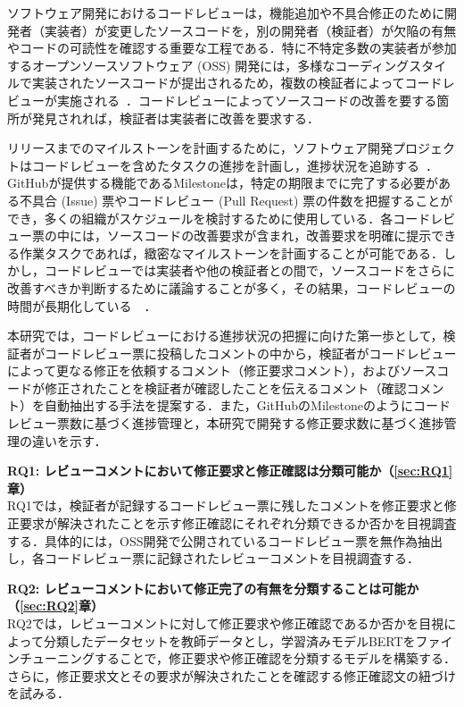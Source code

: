 \documentclass[submit,techrep,noauthor]{ipsj}
\newcommand{\RQOne}{レビューコメントにおいて修正要求と修正確認は分類可能か}
\newcommand{\RQTwo}{レビューコメントにおいて修正完了の有無を分類することは可能か}
\begin{document}
ソフトウェア開発におけるコードレビューは，機能追加や不具合修正のために開発者（実装者）が変更したソースコードを，別の開発者（検証者）が欠陥の有無やコードの可読性を確認する重要な工程である\cite{quality1}\cite{quality2}．特に不特定多数の実装者が参加するオープンソースソフトウェア (OSS) 開発には，多様なコーディングスタイルで実装されたソースコードが提出されるため，複数の検証者によってコードレビューが実施される~\cite{review_process}．コードレビューによってソースコードの改善を要する箇所が発見されれば，検証者は実装者に改善を要求する．

リリースまでのマイルストーンを計画するために，ソフトウェア開発プロジェクトはコードレビューを含めたタスクの進捗を計画し，進捗状況を追跡する~\cite{review_time}．GitHubが提供する機能であるMilestoneは，特定の期限までに完了する必要がある不具合 (Issue) 票やコードレビュー (Pull Request) 票の件数を把握することができ，多くの組織がスケジュールを検討するために使用している．各コードレビュー票の中には，ソースコードの改善要求が含まれ，改善要求を明確に提示できる作業タスクであれば，緻密なマイルストーンを計画することが可能である．しかし，コードレビューでは実装者や他の検証者との間で，ソースコードをさらに改善すべきか判断するために議論することが多く，その結果，コードレビューの時間が長期化している~\cite{review_time1}~\cite{review_time2}．

本研究では，コードレビューにおける進捗状況の把握に向けた第一歩として，検証者がコードレビュー票に投稿したコメントの中から，検証者がコードレビューによって更なる修正を依頼するコメント（修正要求コメント），およびソースコードが修正されたことを検証者が確認したことを伝えるコメント（確認コメント）を自動抽出する手法を提案する．また，GitHubのMilestoneのようにコードレビュー票数に基づく進捗管理と，本研究で開発する修正要求数に基づく進捗管理の違いを示す．

\noindent\textbf{RQ1: \RQOne（\ref{sec:RQ1}章）}\\
RQ1では，検証者が記録するコードレビュー票に残したコメントを修正要求と修正要求が解決されたことを示す修正確認にそれぞれ分類できるか否かを目視調査する．具体的には，OSS開発で公開されているコードレビュー票を無作為抽出し，各コードレビュー票に記録されたレビューコメントを目視調査する．

\noindent\textbf{RQ2: \RQTwo（\ref{sec:RQ2}章）}\\
RQ2では，レビューコメントに対して修正要求や修正確認であるか否かを目視によって分類したデータセットを教師データとし，学習済みモデルBERTをファインチューニングすることで，修正要求や修正確認を分類するモデルを構築する．さらに，修正要求文とその要求が解決されたことを確認する修正確認文の紐づけを試みる．
\end{document}
